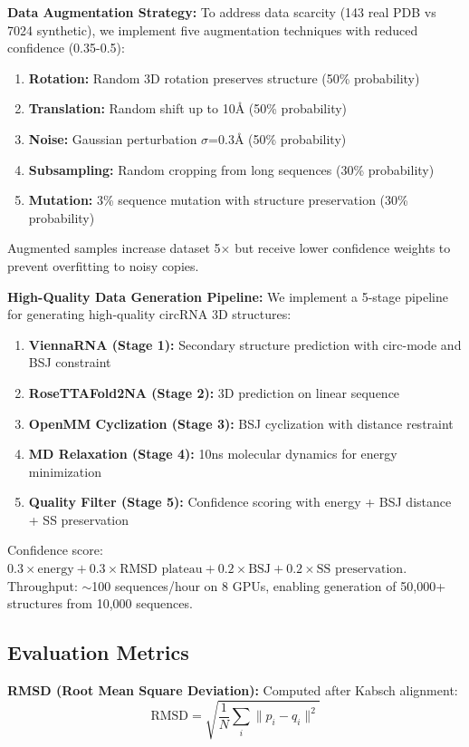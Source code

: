\textbf{Data Augmentation Strategy:} To address data scarcity (143 real PDB vs 7024 synthetic), we implement five augmentation techniques with reduced confidence (0.35-0.5):
\begin{enumerate}
\item \textbf{Rotation:} Random 3D rotation preserves structure (50\% probability)
\item \textbf{Translation:} Random shift up to 10Å (50\% probability)
\item \textbf{Noise:} Gaussian perturbation $\sigma$=0.3Å (50\% probability)
\item \textbf{Subsampling:} Random cropping from long sequences (30\% probability)
\item \textbf{Mutation:} 3\% sequence mutation with structure preservation (30\% probability)
\end{enumerate}
Augmented samples increase dataset 5$\times$ but receive lower confidence weights to prevent overfitting to noisy copies.

\textbf{High-Quality Data Generation Pipeline:} We implement a 5-stage pipeline for generating high-quality circRNA 3D structures:
\begin{enumerate}
\item \textbf{ViennaRNA (Stage 1):} Secondary structure prediction with circ-mode and BSJ constraint
\item \textbf{RoseTTAFold2NA (Stage 2):} 3D prediction on linear sequence
\item \textbf{OpenMM Cyclization (Stage 3):} BSJ cyclization with distance restraint
\item \textbf{MD Relaxation (Stage 4):} 10ns molecular dynamics for energy minimization
\item \textbf{Quality Filter (Stage 5):} Confidence scoring with energy + BSJ distance + SS preservation
\end{enumerate}
Confidence score: $0.3 \times \text{energy} + 0.3 \times \text{RMSD plateau} + 0.2 \times \text{BSJ} + 0.2 \times \text{SS preservation}$. Throughput: $\sim$100 sequences/hour on 8 GPUs, enabling generation of 50,000+ structures from 10,000 sequences.

\subsection{Evaluation Metrics}

\textbf{RMSD (Root Mean Square Deviation):} Computed after Kabsch alignment:
\begin{equation}
\text{RMSD} = \sqrt{\frac{1}{N} \sum_{i} \|p_i - q_i\|^2}
\end{equation}

